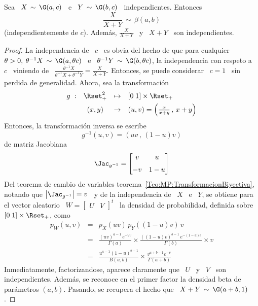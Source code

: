 \begin{lema}
\label{Lem:MP:VinculoBetaGamma}
%
  Sea  \   $X  \,  \sim  \,   \G(a,c)$  \  e  \   $Y  \,  \sim   \,  \G(b,c)$  \
  independientes. Entonces
  \[
  \frac{X}{X+Y} \, \sim \, \beta(a,b)
  \]
  (independientemente  de $c$).   Adem\'as, $\frac{X}{X+Y}$  \ y  \ $X+Y$  \ son
  independientes.
\end{lema}
%
\begin{proof}
  La independencia de \ $c$ \ es obvia del hecho de que para cualquier $\theta >
  0, \: \theta^{-1} X \, \sim \, \G(a,\theta c)$ \ e \ $\theta^{-1} Y \, \sim \,
  \G(b,\theta  c)$,  la independencia  con  respeto  a \  $c$  \  viniendo de  \
  $\frac{\theta^{-1}     X}{\theta^{-1}     X     +     \theta^{-1}     Y}     =
  \frac{X}{X+Y}$.  Entonces, se  puede considerar  \ $c  = 1$  \ sin  perdida de
  generalidad. Ahora, sea la transformaci\'on
  \[
  \begin{array}{lccl}
    g\ : & \Rset_+^2 & \mapsto & [0 \; 1] \times \Rset_+\\[1.5mm]
    & (x,y) & \to & (u,v) = \left( \frac{x}{x+y} \, , \, x+y \right)
  \end{array}
  \]
  Entonces, la transformaci\'on inversa se escribe
  \[
  g^{-1}(u,v) = \left( u v \, , \, (1-u) v \right)
  \]
  de matriz Jacobiana
  \[
  \Jac_{g^{-1}} = \begin{bmatrix} v & u \\[2mm] -v & 1-u \end{bmatrix}
  \]
  Del          teorema          de          cambio         de          variables
  teorema~\ref{Teo:MP:TransformacionBiyectiva},      notando     que     $\left|
    \Jac_{g^{-1}} \right| =  v$ \ y de la  independencia de \ $X$ \ e  \ $Y$, se
  obtiene para el vector aleatorio \ $W = \begin{bmatrix} U & V \end{bmatrix}^t$
  \ la densidad de probabilidad, definida sobre $[0 \; 1] \times \Rset_+$, como
  \begin{eqnarray*}
    p_W(u,v) & = & p_X( u v ) \, p_Y( (1-u) v ) \, v\\[2mm]
    & = & \frac{\left( u v \right)^{a-1} \, e^{- u v}}{\Gamma(a)} \times
    \frac{\left( (1-u) v \right)^{b-1} \, e^{- (1-u) v}}{\Gamma(b)} \times v\\[2mm]
    & = & \frac{u^{a-1} (1-u)^{b-1}}{B(a,b)} \times \frac{v^{a+b-1} e^{-v}}{\Gamma(a+b)}
  \end{eqnarray*}
  Inmediatamente, factorizandose, aparece  claramente que \ $U$ \ y  \ $V$ \ son
  independientes. Adem\'as, se reconoce en  el primer factor la densidad beta de
  par\'ametros $(a,b)$.   Pasando, se recupera  el hecho que  \ $X+Y \,  \sim \,
  \G(a+b,1)$.
\end{proof}

